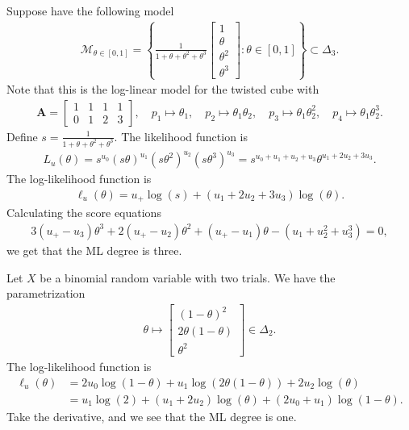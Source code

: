 \begin{eg}
Suppose have the following model 
\begin{align*}
  \mathcal{M}_{\theta \in [0,1]} = \left\{ \frac{1}{1 + \theta + \theta^2 + \theta^3} \begin{bmatrix} 1 \\ \theta \\ \theta^2 \\ \theta^3 \end{bmatrix} : \theta \in [0,1] \right\} \subset \Delta_3.
\end{align*}
Note that this is the log-linear model for the twisted cube with 
\begin{align*}
  \mathbf A = \begin{bmatrix}
    1 & 1& 1 &1 \\
    0 & 1 & 2 & 3 
  \end{bmatrix}, \quad p_1 \mapsto \theta_1, \quad p_2 \mapsto \theta_1 \theta_2, \quad p_3 \mapsto \theta_1 \theta_2^2, \quad p_4 \mapsto \theta_1 \theta_2^3.
\end{align*}
Define \( s = \frac{1}{1 + \theta + \theta^2 + \theta^3} \). The likelihood function is 
\begin{align*}
  L_{u}(\theta) = s^{u_0} (s\theta)^{u_1}(s\theta^2)^{u_2}(s\theta^3)^{u_3} = s^{u_0 + u_1 + u_2 + u_3} \theta^{u_1 + 2u_2 + 3u_3}.
\end{align*}
The log-likelihood function is
\begin{align*}
  \ell_u(\theta) = u_+ \log(s) + (u_1 + 2u_2 + 3u_3) \log(\theta).
\end{align*}
Calculating the score equations
\begin{align*}
  3(u_+ - u_3)\theta^3 + 2(u_+ - u_2)\theta^2 + (u_+ - u_1)\theta - (u_1 + u_2^2 + u_3^3) = 0,
\end{align*}
we get that the ML degree is three.
\end{eg}

\begin{eg}
  Let \( X \) be a binomial random variable with two trials. We have the parametrization 
  \begin{align*}
    \theta \mapsto \begin{bmatrix}
      (1 - \theta)^2 \\
      2\theta(1 - \theta) \\
      \theta^2
    \end{bmatrix} \in \Delta_2.
  \end{align*} 
  The log-likelihood function is 
  \begin{align*}
    \ell_{u}(\theta) &= 2u_0 \log(1 - \theta) + u_1 \log(2\theta(1- \theta)) + 2u_2 \log(\theta) \\
    &= u_1 \log(2) + (u_1 + 2u_2)\log(\theta) + (2u_0 + u_1)\log(1 - \theta).
  \end{align*}
  Take the derivative, and we see that the ML degree is one.
\end{eg}

